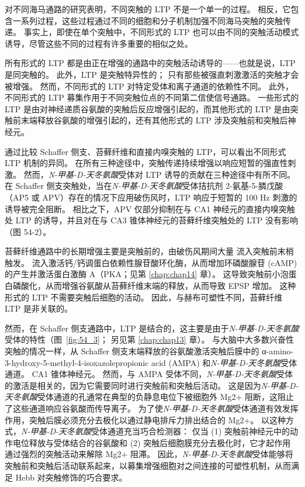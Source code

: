 对不同海马通路的研究表明，不同突触的 LTP 不是一个单一的过程。
相反，它包含一系列过程，这些过程通过不同的细胞和分子机制加强不同海马突触的突触传递。
事实上，即使在单个突触中，不同形式的 LTP 也可以由不同的突触活动模式诱导，尽管这些不同的过程有许多重要的相似之处。


所有形式的 LTP 都是由正在增强的通路中的突触活动诱导的——也就是说，LTP 是同突触的。
此外，LTP 是突触特异性的；
只有那些被强直刺激激活的突触才会被增强。
然而，不同形式的 LTP 对特定受体和离子通道的依赖性不同。 此外，不同形式的 LTP 募集作用于不同突触位点的不同第二信使信号通路。
一些形式的 LTP 是由对神经递质谷氨酸的突触后反应增强引起的，而其他形式的 LTP 是由突触前末端释放谷氨酸的增强引起的，还有其他形式的 LTP 涉及突触前和突触后神经元。


通过比较 Schaffer 侧支、苔藓纤维和直接内嗅突触的 LTP，可以看出不同形式 LTP 机制的异同。
在所有三种途径中，突触传递持续增强以响应短暂的强直性刺激。
然而，\textit{N-甲基-D-天冬氨酸}受体对 LTP 诱导的贡献在三种途径中有所不同。
在 Schaffer 侧支突触处，当在\textit{N-甲基-D-天冬氨酸}受体拮抗剂 2-氨基-5-膦戊酸（AP5 或 APV）存在的情况下应用破伤风时，LTP 响应于短暂的 100 Hz 刺激的诱导被完全阻断。
相比之下，APV 仅部分抑制在与 CA1 神经元的直接内嗅突触处 LTP 的诱导，并且对在与 CA3 锥体神经元的苔藓纤维突触处的 LTP 没有影响（图 54-2）。


苔藓纤维通路中的长期增强主要是突触前的，由破伤风期间大量  流入突触前末梢触发。
 流入激活钙/钙调蛋白依赖性腺苷酸环化酶，从而增加环磷酸腺苷 (cAMP) 的产生并激活蛋白激酶 A（PKA；见第 \ref{chap:chap14} 章）。
这导致突触前小泡蛋白磷酸化，从而增强谷氨酸从苔藓纤维末端的释放，从而导致 EPSP 增加。
这种形式的 LTP 不需要突触后细胞的活动。
因此，与赫布可塑性不同，苔藓纤维 LTP 是非关联的。


然而，在 Schaffer 侧支通路中，LTP 是结合的，这主要是由于\textit{N-甲基-D-天冬氨酸}受体的特性（图~\ref{fig:54_3}；
另见第 \ref{chap:chap13} 章）。
与大脑中大多数兴奋性突触的情况一样，从 Schaffer 侧支末端释放的谷氨酸激活突触后膜中的 α-amino-3-hydroxy-5-methyl-4-isoxazolepropionic acid (AMPA) 和\textit{N-甲基-D-天冬氨酸}受体通道。
CA1 锥体神经元。 然而，与 AMPA 受体不同，\textit{N-甲基-D-天冬氨酸}受体的激活是相关的，因为它需要同时进行突触前和突触后活动。
这是因为\textit{N-甲基-D-天冬氨酸}受体通道的孔通常在典型的负静息电位下被细胞外 Mg2+ 阻断，这阻止了这些通道响应谷氨酸而传导离子。
为了使\textit{N-甲基-D-天冬氨酸}受体通道有效发挥作用，突触后膜必须充分去极化以通过静电排斥力排出结合的 Mg2+。
以这种方式，\textit{N-甲基-D-天冬氨酸}受体通道充当巧合检测器：
仅当 (1) 突触前神经元中的动作电位释放与受体结合的谷氨酸和 (2) 突触后细胞膜充分去极化时，它才起作用 通过强烈的突触活动来解除 Mg2+ 阻滞。
因此，\textit{N-甲基-D-天冬氨酸}受体能够将突触前和突触后活动联系起来，以募集增强细胞对之间连接的可塑性机制，从而满足 Hebb 对突触修饰的巧合要求。


